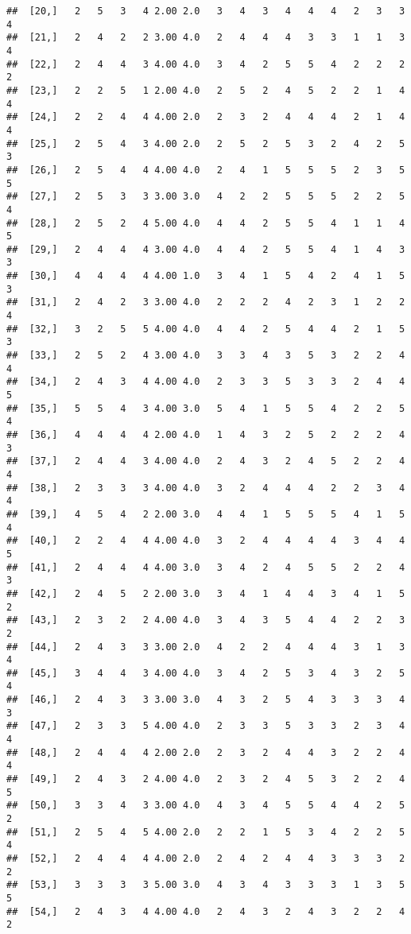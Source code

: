 \documentclass[]{article}
\begin{document}
\begin{verbatim}
##  [20,]   2   5   3   4 2.00 2.0   3   4   3   4   4   4   2   3   3   4
##  [21,]   2   4   2   2 3.00 4.0   2   4   4   4   3   3   1   1   3   4
##  [22,]   2   4   4   3 4.00 4.0   3   4   2   5   5   4   2   2   2   2
##  [23,]   2   2   5   1 2.00 4.0   2   5   2   4   5   2   2   1   4   4
##  [24,]   2   2   4   4 4.00 2.0   2   3   2   4   4   4   2   1   4   4
##  [25,]   2   5   4   3 4.00 2.0   2   5   2   5   3   2   4   2   5   3
##  [26,]   2   5   4   4 4.00 4.0   2   4   1   5   5   5   2   3   5   5
##  [27,]   2   5   3   3 3.00 3.0   4   2   2   5   5   5   2   2   5   4
##  [28,]   2   5   2   4 5.00 4.0   4   4   2   5   5   4   1   1   4   5
##  [29,]   2   4   4   4 3.00 4.0   4   4   2   5   5   4   1   4   3   3
##  [30,]   4   4   4   4 4.00 1.0   3   4   1   5   4   2   4   1   5   3
##  [31,]   2   4   2   3 3.00 4.0   2   2   2   4   2   3   1   2   2   4
##  [32,]   3   2   5   5 4.00 4.0   4   4   2   5   4   4   2   1   5   3
##  [33,]   2   5   2   4 3.00 4.0   3   3   4   3   5   3   2   2   4   4
##  [34,]   2   4   3   4 4.00 4.0   2   3   3   5   3   3   2   4   4   5
##  [35,]   5   5   4   3 4.00 3.0   5   4   1   5   5   4   2   2   5   4
##  [36,]   4   4   4   4 2.00 4.0   1   4   3   2   5   2   2   2   4   3
##  [37,]   2   4   4   3 4.00 4.0   2   4   3   2   4   5   2   2   4   4
##  [38,]   2   3   3   3 4.00 4.0   3   2   4   4   4   2   2   3   4   4
##  [39,]   4   5   4   2 2.00 3.0   4   4   1   5   5   5   4   1   5   4
##  [40,]   2   2   4   4 4.00 4.0   3   2   4   4   4   4   3   4   4   5
##  [41,]   2   4   4   4 4.00 3.0   3   4   2   4   5   5   2   2   4   3
##  [42,]   2   4   5   2 2.00 3.0   3   4   1   4   4   3   4   1   5   2
##  [43,]   2   3   2   2 4.00 4.0   3   4   3   5   4   4   2   2   3   2
##  [44,]   2   4   3   3 3.00 2.0   4   2   2   4   4   4   3   1   3   4
##  [45,]   3   4   4   3 4.00 4.0   3   4   2   5   3   4   3   2   5   4
##  [46,]   2   4   3   3 3.00 3.0   4   3   2   5   4   3   3   3   4   3
##  [47,]   2   3   3   5 4.00 4.0   2   3   3   5   3   3   2   3   4   4
##  [48,]   2   4   4   4 2.00 2.0   2   3   2   4   4   3   2   2   4   4
##  [49,]   2   4   3   2 4.00 4.0   2   3   2   4   5   3   2   2   4   5
##  [50,]   3   3   4   3 3.00 4.0   4   3   4   5   5   4   4   2   5   2
##  [51,]   2   5   4   5 4.00 2.0   2   2   1   5   3   4   2   2   5   4
##  [52,]   2   4   4   4 4.00 2.0   2   4   2   4   4   3   3   3   2   2
##  [53,]   3   3   3   3 5.00 3.0   4   3   4   3   3   3   1   3   5   5
##  [54,]   2   4   3   4 4.00 4.0   2   4   3   2   4   3   2   2   4   2

\end{verbatim}
\end{document}
